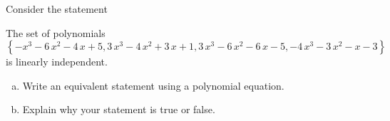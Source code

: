 
\begin{exerciseStatement}


Consider the statement 
\begin{center}\begin{minipage}{0.8\textwidth}
 The set of polynomials \( \left\{ -x^{3} - 6 \, x^{2} - 4 \, x + 5 , 3 \, x^{3} - 4 \, x^{2} + 3 \, x + 1 , 3 \, x^{3} - 6 \, x^{2} - 6 \, x - 5 , -4 \, x^{3} - 3 \, x^{2} - x - 3 \right\} \) is linearly independent.
\end{minipage}\end{center}
    


\begin{enumerate}[(a)]
\item  Write an equivalent statement using a polynomial equation.
\item  Explain why your statement is true or false.
\end{enumerate}
    
\end{exerciseStatement}
    
